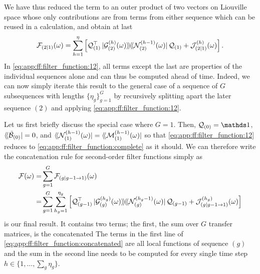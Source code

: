 We have thus reduced the term to an outer product of two vectors on Liouville space whose only contributions are from terms from either sequence which can be reused in a calculation, and obtain at last
\begin{equation}\label{eq:app:ff:filter_function:12}
    \FF_{(2|1)}(\omega) = \sum_{h=1}^{\eta}\left[
        \liouvQ_{(1)}\transpose\dop*{\mc{G}_{(2)}\gth{h}(\omega)}{\mc{N}_{(2)}\gth{h-1}(\omega)}\liouvQ_{(1)} + \mc{J}_{(2|1)}\gth{h}(\omega)
    \right].
\end{equation}
In \cref{eq:app:ff:filter_function:12}, all terms except the last are properties of the individual sequences alone and can thus be computed ahead of time.
Indeed, we can now simply iterate this result to the general case of a sequence of $G$ subsequences with lengths $\lbrace\eta_g\rbrace_{g=1}^G$ by recursively splitting apart the later sequence $(2)$ and applying \cref{eq:app:ff:filter_function:12}.

Let us first briefly discuss the special case where $G=1$.
Then, $\liouvQ_{(0)}=\eye$, $\dbra*{\ctrlmat_{(0)}} = 0$, and $\dbra*{\mc{N}_{(1)}\gth{h-1}(\omega)} = \dbra*{\mc{M}_{(1)}\gth{h-1}(\omega)}$ so that \cref{eq:app:ff:filter_function:12} reduces to \cref{eq:app:ff:filter_function:complete} as it should.
We can therefore write the concatenation rule for second-order filter functions simply as
\begin{align}
    \FF(\omega) =& \sum_{g=1}^{G} \FF_{(g|g-1\to 1)}(\omega) \\
                =& \sum_{g=1}^{G}\sum_{h_{g}=1}^{\eta_g}\left[
                        \liouvQ_{(g-1)}\transpose\dop*{\mc{G}_{(g)}\gth{h_g}(\omega)}{\mc{N}_{(g)}\gth{h_g-1}(\omega)}\liouvQ_{(g-1)}
                        + \mc{J}_{(g|g-1\to 1)}\gth{h_g}(\omega)
                    \right] \label{eq:app:ff:filter_function:concatenated}
\end{align}
 is our final result.
It contains two terms; the first, the sum over $G$ transfer matrices, is the concatenated 
The terms in the first line of \cref{eq:app:ff:filter_function:concatenated} are all local functions of sequence $(g)$ and the sum in the second line needs to be computed for every single time step $h\in\{1,\dotsc,\sum_g\eta_g\}$.